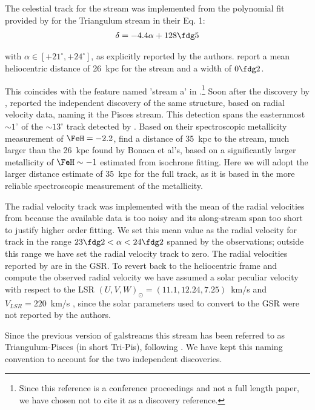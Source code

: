 The celestial track for the stream was implemented from the polynomial fit provided by \citet{Bonaca2012} for the Triangulum stream in their Eq. 1:
\begin{eqnarray*}
\delta = -4.4\alpha + 128\fdg5
\end{eqnarray*}

with $\alpha \in [+21^\circ,+24^\circ]$, as explicitly reported by the authors. \citet{Bonaca2012} report a mean heliocentric 
distance of 26~kpc for the stream and a width of $0\fdg2$. 

This coincides with the feature named 'stream a' in \citet{Grillmair2012}.\footnote{Since this reference is a conference proceedings and not a full length paper, we have chosen not to cite it as a discovery reference.}
Soon after the discovery by \citet{Bonaca2012}, \citet{Martin2013} reported the independent discovery of the same structure, based on radial velocity data, naming it the Pisces stream. This detection spans the easternmost $\sim1^\circ$ of the $\sim13^\circ$ track detected by \citet{Bonaca2012}. Based on their spectroscopic metallicity measurement of $\FeH=-2.2$, \citet{Martin2013} find a distance of 35~kpc to the stream, much larger than the 26~kpc found by Bonaca et al's, based on a significantly larger metallicity of $\FeH\sim -1$ estimated from isochrone fitting. Here we will adopt the larger distance estimate of 35~kpc for the full track, as it is based in the more reliable spectroscopic measurement of the metallicity.

The radial velocity track was implemented with the mean of the radial velocities from \citet{Martin2013} because the available data is too noisy and its along-stream span too short to justify higher order fitting. We set this mean value as the radial velocity for track in the range $23\fdg2<\alpha<24\fdg2$ spanned by the observations; outside this range we have set the radial velocity track to zero. The radial velocities reported by \citet{Martin2013} are in the GSR. To revert back to the heliocentric frame and compute the observed radial velocity we have assumed  a solar peculiar velocity with respect to the LSR $(U,V,W)_\odot=(11.1,12.24,7.25)$~km/s \citep{Schoenrich2010} and  $V_{LSR}=220$~km/s \citep{DehnenBinney1998}, since the solar parameters used to convert to the GSR were not reported by the authors.

Since the previous version of galstreams this stream has been referred to as Triangulum-Pisces (in short Tri-Pis), following \citet{GrillmairCarlin2016}. We have kept this naming convention to account for the two independent discoveries.

